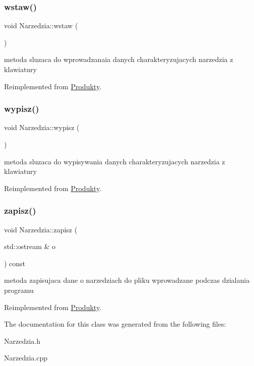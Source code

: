 \subsubsection{\texorpdfstring{wstaw()}{wstaw()}}
{\footnotesize\ttfamily void Narzedzia\+::wstaw (\begin{DoxyParamCaption}{ }\end{DoxyParamCaption})\hspace{0.3cm}{\ttfamily [virtual]}}

metoda sluzaca do wprowadzanaia danych charakteryzujacych narzedzia z klawiatury 

Reimplemented from \mbox{\hyperlink{class_produkty_ad69fa64c8984c55fe9b1a2ade607a0ed}{Produkty}}.

\mbox{\label{class_narzedzia_a39cd48d9367f3a4e8fcc30878a320338}} 
\subsubsection{\texorpdfstring{wypisz()}{wypisz()}}
{\footnotesize\ttfamily void Narzedzia\+::wypisz (\begin{DoxyParamCaption}{ }\end{DoxyParamCaption})\hspace{0.3cm}{\ttfamily [virtual]}}

metoda sluzaca do wypisywania danych charakteryzujacych narzedzia z klawiatury 

Reimplemented from \mbox{\hyperlink{class_produkty_a720c6591cfbb332f99baccf0f54c4ada}{Produkty}}.

\mbox{\label{class_narzedzia_a4178a26508e00853e8c5c483f9a439a3}} 
\subsubsection{\texorpdfstring{zapisz()}{zapisz()}}
{\footnotesize\ttfamily void Narzedzia\+::zapisz (\begin{DoxyParamCaption}\item[{std\+::ostream \&}]{o }\end{DoxyParamCaption}) const\hspace{0.3cm}{\ttfamily [virtual]}}

metoda zapisujaca dane o narzedziach do pliku wprowadzane podczas dzialania programu 

Reimplemented from \mbox{\hyperlink{class_produkty_a49c2ba4084346df8e7c987b9ec62676e}{Produkty}}.



The documentation for this class was generated from the following files\+:\begin{DoxyCompactItemize}
\item 
Narzedzia.\+h\item 
Narzedzia.\+cpp\end{DoxyCompactItemize}

